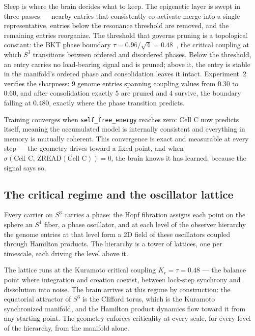 \documentclass[12pt,a4paper]{article}
\theoremstyle{definition}
\theoremstyle{remark}
\begin{document}
Sleep is where the brain decides what to keep. The epigenetic layer is swept
in three passes --- nearby entries that consistently co-activate merge into a
single representative, entries below the resonance threshold are removed,
and the remaining entries reorganize. The threshold that governs pruning is a
topological constant: the BKT phase boundary $\tau = 0.96/\sqrt{4} = 0.48$~\cite{BKT,sharpe2026},
the critical coupling at which $S^3$ transitions between ordered and disordered
phases. Below the threshold, an entry carries no load-bearing signal and is
pruned; above it, the entry is stable in the manifold's ordered phase and
consolidation leaves it intact. Experiment~2 verifies the sharpness: 9 genome entries spanning
coupling values from 0.30 to 0.60, and after consolidation exactly 5 are
pruned and 4 survive, the boundary falling at 0.480, exactly where the phase
transition predicts.

Training converges when \texttt{self\_free\_energy} reaches zero: Cell C now
predicts itself, meaning the accumulated model is internally consistent and
everything in memory is mutually coherent. This convergence is exact and
measurable at every step --- the geometry drives toward a fixed point, and
when $\sigma(\text{Cell C},\, \mathrm{ZREAD}(\text{Cell C})) = 0$, the brain
knows it has learned, because the signal says so.

\subsection{The critical regime and the oscillator lattice}

Every carrier on $S^3$ carries a phase: the Hopf fibration assigns each
point on the sphere an $S^1$ fiber, a phase oscillator, and at each level
of the observer hierarchy the genome entries at that level form a 2D field
of these oscillators coupled through Hamilton products. The hierarchy is
a tower of lattices, one per timescale, each driving the level above it.

The lattice runs at the Kuramoto critical coupling $K_c = \tau = 0.48$ ---
the balance point where integration and creation coexist, between lock-step
synchrony and dissolution into noise. The brain arrives at this regime by
construction: the equatorial attractor of $S^3$ is the Clifford torus, which
is the Kuramoto synchronized manifold, and the Hamilton product dynamics flow
toward it from any starting point. The geometry enforces criticality at every
scale, for every level of the hierarchy, from the manifold alone.
\end{document}
